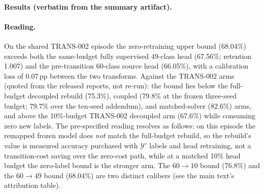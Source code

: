 \documentclass[11pt,a4paper]{article}
\begin{document}
\paragraph{Results (verbatim from the summary artifact).}
\begin{center}
\footnotesize
{}%
\end{center}

\paragraph{Reading.}
On the shared TRANS-002 episode the zero-retraining upper bound (68.04\%) exceeds both the same-budget fully supervised 49-class head (67.56\%; retention 1.007) and the pre-transition 60-class source head (66.05\%), with a calibration loss of 0.07\,pp between the two transforms. Against the TRANS-002 arms (quoted from the released reports, not re-run): the bound lies below the full-budget decoupled rebuild (75.3\%), coupled (79.8\% at the frozen three-seed budget; 79.7\% over the ten-seed addendum), and matched-solver (82.6\%) arms, and above the 10\%-budget TRANS-002 decoupled arm (67.6\%) while consuming zero new labels. The pre-specified reading resolves as follows: on this episode the remapped frozen model does \emph{not} match the full-budget rebuild, so the rebuild's value is measured accuracy purchased with $\mathcal{Y}'$ labels and head retraining, not a transition-cost saving over the zero-cost path, while at a matched 10\% head budget the zero-label bound is the stronger arm. The $60\to10$ bound (76.8\%) and the $60\to49$ bound (68.04\%) are two distinct calibers (see the main text's attribution table).
\end{document}
